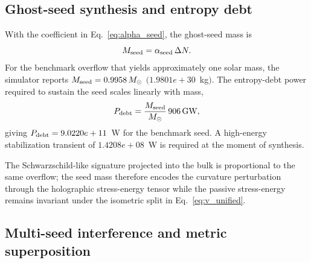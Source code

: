 \documentclass[aps,pra,10pt,onecolumn,superscriptaddress,nofootinbib,longbibliography,floatfix]{revtex4-2}
\newcommand{\ExoticGhostMassSun}{0.9958}%
\newcommand{\ExoticGhostMassKg}{1.9801e+30}%
\newcommand{\ExoticEntropyDebtPower}{9.0220e+11}%
\newcommand{\ExoticHighEnergyTransient}{1.4208e+08}%
\begin{document}
\subsection{Ghost-seed synthesis and entropy debt}

With the coefficient in Eq.~\eqref{eq:alpha_seed}, the ghost-seed mass is
%
\begin{equation}
M_{\rm seed} = \alpha_{\rm seed} \, \Delta N .
\end{equation}
%
For the benchmark overflow that yields approximately one solar mass, the simulator reports $M_{\rm seed} = \ExoticGhostMassSun{}\,M_{\odot}$ $(\ExoticGhostMassKg{}$~kg$)$.  The entropy-debt power required to sustain the seed scales linearly with mass,
%
\begin{equation}
P_{\rm debt} = \frac{M_{\rm seed}}{M_{\odot}} \, 906\,\text{GW} ,
\end{equation}
%
 giving $P_{\rm debt} = \ExoticEntropyDebtPower{}$~W for the benchmark seed.  A high-energy stabilization transient of $\ExoticHighEnergyTransient{}$~W is required at the moment of synthesis.

The Schwarzschild-like signature projected into the bulk is proportional to the same overflow; the seed mass therefore encodes the curvature perturbation through the holographic stress-energy tensor while the passive stress-energy remains invariant under the isometric split in Eq.~\eqref{eq:v_unified}.

\subsection{Multi-seed interference and metric superposition}\label{sec:multi-seed}
\end{document}
